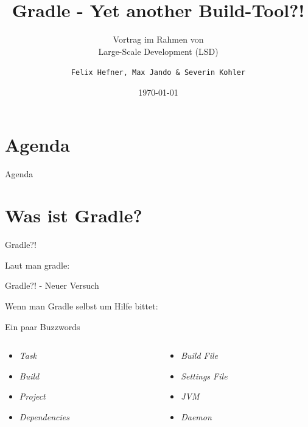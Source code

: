 \documentclass[newPxFont,numfooter,sectionpages,notes]{beamer}
\title{Gradle - Yet another Build-Tool?!}
\subtitle{Vortrag im Rahmen von \\ Large-Scale Development (LSD)}
\date{\today{}}
\author{\texttt{Felix Hefner, Max Jando \& Severin Kohler}}
\institute{Hochschule Mannheim, WS 2017/18}
\begin{document}
%
%

\maketitle


%
%

\section*{Agenda}

\begin{frame}{Agenda}
\tableofcontents[hideallsubsections]
\end{frame}

\section{Was ist Gradle?}

\begin{frame}{Gradle?!}

Laut \alert{man gradle}:



\end{frame}

\begin{frame}{Gradle?! - Neuer Versuch}

Wenn man Gradle selbst um Hilfe bittet:



\end{frame}

\begin{frame}{Ein paar Buzzwords}
\begin{columns}
	\begin{column}{.48\linewidth}
		\begin{itemize}
			\item \emph{Task}
			\item \emph{Build}
			\item \emph{Project}
			\item \emph{Dependencies}
		\end{itemize}
	\end{column}
	\begin{column}{.48\linewidth}
		\begin{itemize}
			\item \emph{Build File}
			\item \emph{Settings File}
			\item \emph{JVM}
			\item \emph{Daemon}
		\end{itemize}
	\end{column}
\end{columns}
\end{frame}
\end{document}
